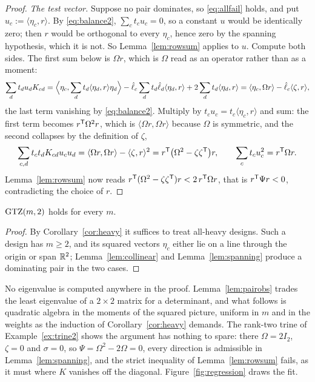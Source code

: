 \begin{proof}
\emph{The test vector.}  Suppose no pair dominates, so
\eqref{eq:allfail} holds, and put $u_c:=\langle \eta_c,r\rangle$.  By
\eqref{eq:balance2}, $\sum_ct_cu_c=0$, so a constant $u$ would be
identically zero; then $r$ would be orthogonal to every $\eta_c$, hence
zero by the spanning hypothesis, which it is not.  So
Lemma~\ref{lem:rowsum} applies to $u$.  Compute both sides.  The first sum
below is $\Omega r$, which is $\Omega$ read as an operator rather than as
a moment:
\[
  \sum_d t_du_dK_{cd}
  =\Bigl\langle \eta_c,\sum_d t_d\langle \eta_d,r\rangle \eta_d\Bigr\rangle
   -\hat\ell_c\sum_d t_d\hat\ell_d\langle \eta_d,r\rangle
   +2\sum_d t_d\langle \eta_d,r\rangle
  =\langle \eta_c,\Omega r\rangle-\hat\ell_c\langle\zeta,r\rangle ,
\]
the last term vanishing by \eqref{eq:balance2}.  Multiply by
$t_cu_c=t_c\langle \eta_c,r\rangle$ and sum: the first term becomes
$r^{\mathsf{T}}\Omega^2r$, which is $\langle\Omega r,\Omega r\rangle$ because
$\Omega$ is symmetric, and the second collapses by the definition of
$\zeta$,
\[
  \sum_{c,d}t_ct_dK_{cd}u_cu_d
  =\langle\Omega r,\Omega r\rangle-\langle\zeta,r\rangle^2
  =r^{\mathsf{T}}\bigl(\Omega^2-\zeta\zeta^{\mathsf{T}}\bigr)r ,
  \qquad
  \sum_c t_cu_c^2=r^{\mathsf{T}}\Omega r .
\]
Lemma~\ref{lem:rowsum} now reads $r^{\mathsf{T}}(\Omega^2-\zeta\zeta^{\mathsf{T}})r<2\,
r^{\mathsf{T}}\Omega r$, that is $r^{\mathsf{T}}\Psi r<0$, contradicting the choice of $r$.
\end{proof}

\begin{theorem}[Lean]\label{thm:ranktwo}
$\mathrm{GTZ}(m,2)$ holds for every $m$.
\end{theorem}

\begin{proof}
By Corollary~\ref{cor:heavy} it suffices to treat all-heavy designs.  Such
a design has $m\ge2$, and its squared vectors $\eta_c$ either lie on a line
through the origin or span $\mathbb{R}^2$; Lemma~\ref{lem:collinear} and
Lemma~\ref{lem:spanning} produce a dominating pair in the two cases.
\end{proof}

No eigenvalue is computed anywhere in the proof.  Lemma~\ref{lem:pairobs}
trades the least eigenvalue of a $2\times2$ matrix for a determinant,
and what follows is quadratic algebra in the moments of the squared
picture, uniform in $m$ and in the weights as the induction of
Corollary~\ref{cor:heavy} demands.  The rank-two trine of
Example~\ref{ex:trine2} shows the argument has nothing to spare: there
$\Omega=2I_2$, $\zeta=0$ and $\sigma=0$, so $\Psi=\Omega^2-2\Omega=0$,
every direction is admissible in Lemma~\ref{lem:spanning}, and the strict
inequality of Lemma~\ref{lem:rowsum} fails, as it must where $K$ vanishes
off the diagonal.  Figure~\ref{fig:regression} draws the fit.

